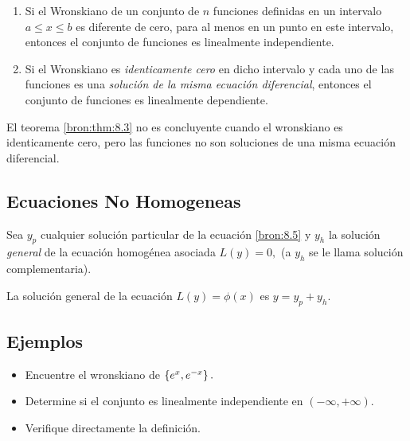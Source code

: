 	\begin{teorema}
		\label{bron:thm:8.3}
		\begin{enumerate}
			\item   Si el Wronskiano de un conjunto de $n$ funciones definidas en un intervalo $a \leq x \leq b$ es diferente de cero, para al menos en un punto en este intervalo, entonces el conjunto de funciones es linealmente independiente.
			\item
			Si el Wronskiano es \emph{identicamente cero} en dicho intervalo y cada uno de las funciones es una \emph{soluci\'on de la misma ecuaci\'on diferencial}, entonces el conjunto de funciones es linealmente dependiente.
		\end{enumerate}
	\end{teorema}




	\begin{observacion}
		El teorema \ref{bron:thm:8.3} no es concluyente cuando el wronskiano es identicamente cero, pero las funciones no son soluciones de una misma ecuaci\'on diferencial.
	\end{observacion}



\subsection{Ecuaciones No Homogeneas}


	Sea $y_{p}$ cualquier soluci\'on particular de la ecuaci\'on \eqref{bron:8.5} y $y_{h}$ la soluci\'on \emph{general} de la ecuaci\'on homog\'enea asociada $L(y)=0,$ (a $y_{h}$ se le llama soluci\'on complementaria).


	\begin{teorema}
		\label{bron:thm:8.4}
		La soluci\'on general de la ecuaci\'on $L(y)=\phi(x)$ es $y=y_{p}+y_{h}.$
	\end{teorema}



\subsection{Ejemplos}


	\begin{resuelto}
		\begin{itemize}
			\item Encuentre el wronskiano de $\left\{ e^{x},e^{-x} \right\}.$

			\item Determine si el conjunto es linealmente independiente en $(-\infty,+\infty).$

			\item Verifique directamente la definición.
		\end{itemize}

	\end{resuelto}




